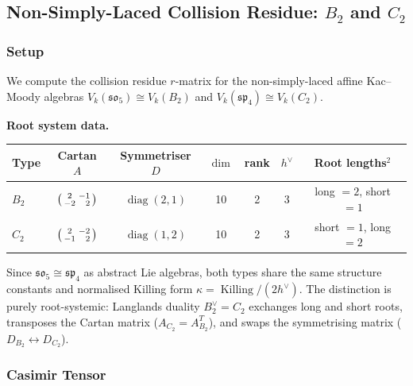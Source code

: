 
\subsection*{Non-Simply-Laced Collision Residue: $B_2$ and $C_2$}

\subsubsection*{Setup}

We compute the collision residue $r$-matrix for the non-simply-laced
affine Kac--Moody algebras $V_k(\mathfrak{so}_5) \cong V_k(B_2)$ and
$V_k(\mathfrak{sp}_4) \cong V_k(C_2)$.

\medskip
\noindent\textbf{Root system data.}
\begin{center}
\begin{tabular}{lcccccc}
\toprule
Type & Cartan $A$ & Symmetriser $D$ & $\dim$ & rank & $h^\vee$ & Root lengths${}^2$ \\
\midrule
$B_2$ & $\begin{psmallmatrix} 2 & -1 \\ -2 & \phantom{-}2 \end{psmallmatrix}$
 & $\operatorname{diag}(2,1)$ & 10 & 2 & 3 & long $= 2$, short $= 1$ \\[4pt]
$C_2$ & $\begin{psmallmatrix} 2 & -2 \\ -1 & \phantom{-}2 \end{psmallmatrix}$
 & $\operatorname{diag}(1,2)$ & 10 & 2 & 3 & short $= 1$, long $= 2$ \\
\bottomrule
\end{tabular}
\end{center}

\noindent Since $\mathfrak{so}_5 \cong \mathfrak{sp}_4$ as abstract Lie algebras,
both types share the same structure constants and normalised Killing form
$\kappa = \operatorname{Killing}/(2h^\vee)$.
The distinction is purely root-systemic: Langlands duality $B_2^\vee = C_2$
exchanges long and short roots, transposes the Cartan matrix ($A_{C_2} = A_{B_2}^T$),
and swaps the symmetrising matrix ($D_{B_2} \leftrightarrow D_{C_2}$).

\subsubsection*{Casimir Tensor}

